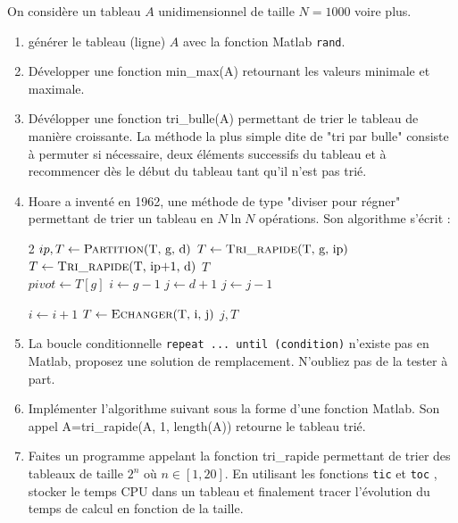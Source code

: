 \documentclass[a4paper, 12pt]{article}
\begin{document}
On considère un tableau $A$ unidimensionnel de taille $N=1000$ voire plus. 
\begin{enumerate} 
\item générer le tableau (ligne) $A$ avec la fonction Matlab {\tt rand}.
\item Développer une fonction min\_max(A) retournant les valeurs minimale et maximale.

\item Dévélopper une fonction tri\_bulle(A) permettant de trier le tableau de manière croissante.
La méthode la plus simple dite de "tri par bulle" consiste à permuter si nécessaire, deux éléments successifs
du tableau et à recommencer dès le début du tableau tant qu'il n'est pas trié.

\item  Hoare a inventé en 1962, une méthode de type "diviser pour régner"  permettant de trier un
tableau en $N \ln N$ opérations. Son algorithme s'écrit :

\begin{algorithmic}[1]
   \begin{multicols}{2}
        \State $ip, T \gets \Call{Partition}{$T, g, d$} $
         \State $T \gets \Call{Tri\_rapide}{$T, g, ip$} $
         \State $T \gets \Call{Tri\_rapide}{$T, ip+1, d$} $
    \EndIf
    \State \Return $T$
\EndFunction
\\
    \State $pivot \gets T[g]$
    \State $i \gets g-1$
    \State $j \gets d+1$
        \columnbreak
    \Repeat
    \State $j \gets j-1$

    \Repeat
    \State $i \gets i+1$
    \State $T \gets \Call{Echanger}{$T, i, j$} $
    \Else
    \State \Return $j, T$
    \EndIf
        \EndWhile
\EndFunction
\end{multicols}
\end{algorithmic}


\item La boucle conditionnelle {\tt repeat ... until (condition)} n'existe pas en Matlab, proposez
une solution de remplacement. N'oubliez pas de la tester à part.

\item Implémenter l'algorithme suivant sous la forme d'une fonction Matlab. Son appel 
A=tri\_rapide(A, 1, length(A)) retourne le tableau trié.


\item Faites un programme appelant la fonction tri\_rapide permettant de trier des tableaux
de taille $2^n$ où $n \in [1, 20]$.  En utilisant les fonctions {\tt tic} et {\tt toc} , stocker le temps CPU
dans un tableau et finalement tracer l'évolution du temps de calcul en fonction de la taille.


\end{enumerate}
\end{document}
